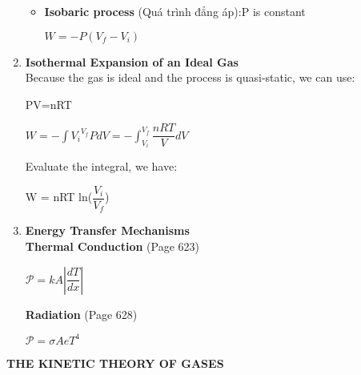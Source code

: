 \documentclass[10pt]{article}
\begin{document}
\begin{enumerate}
\begin{itemize}
\begin{mybox}
		\end{mybox}
		\item \textbf{Isobaric process} (Quá trình đẳng áp):P is constant
		\begin{mybox}
		\begin{center}
		$W = -P(V_f-V_i)$
		\end{center}
		\end{mybox}
	\end{itemize}
	\item \textbf{Isothermal Expansion of an Ideal Gas}\\
	Because the gas is ideal and the process is quasi-static, we can use: 
	\begin{mybox}
	\begin{center}
	PV=nRT
	\end{center}
	\end{mybox}
	\begin{center}
	$W = - \displaystyle \int {V_i}^{V_f}PdV = - \int_{V_i}^{V_f} \dfrac{nRT}{V}dV$
	\end{center}
	Evaluate the integral, we have:
	\begin{mybox}
	\begin{center}
	W = nRT ln($\dfrac{V_i}{V_f}$)
	\end{center}
	\end{mybox}
	\item \textbf{Energy Transfer Mechanisms}\\
	\textbf{Thermal Conduction} (Page 623)\\
	\begin{mybox}
	\begin{center}
	$\mathcal{P} = kA \displaystyle | \dfrac{dT}{dx} |$
	\end{center}
	\end{mybox}
	\textbf{Radiation} (Page 628)\\
	\begin{mybox}
	\begin{center}
	$\mathcal{P} = \sigma AeT^4$
	\end{center}
	\end{mybox}
\end{enumerate}
\pagebreak
\begin{center}
\textbf{THE KINETIC THEORY OF GASES}
\end{center}
\end{document}
